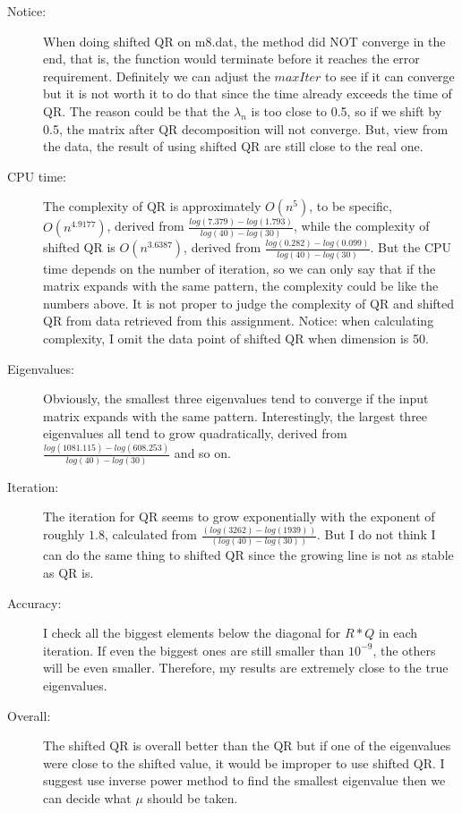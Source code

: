 \documentclass[12pt,a4paper]{article}
\begin{document}
\begin{description}
\item [Notice:] When doing shifted QR on m8.dat, the method did NOT converge in the end, that is, the function would terminate before it reaches the error requirement. Definitely we can adjust the $maxIter$ to see if it can converge but it is not worth it to do that since the time already exceeds the time of QR. The reason could be that the $\lambda_n$ is too close to 0.5, so if we shift by 0.5, the matrix after QR decomposition will not converge. But, view from the data, the result of using shifted QR are still close to the real one.
\item [CPU time:]  The complexity of QR is approximately $O(n^5)$, to be specific, $O(n^{4.9177})$, derived from $\frac{log(7.379) - log(1.793)}{log(40) - log(30)}$, while the complexity of shifted QR is $O(n^{3.6387})$, derived from $\frac{log(0.282) - log(0.099)}{log(40) - log(30)}$. But the CPU time depends on the number of iteration, so we can only say that if the matrix expands with the same pattern, the complexity could be like the numbers above. It is not proper to judge the complexity of QR and shifted QR from data retrieved from this assignment. Notice: when calculating complexity, I omit the data point of shifted QR when dimension is 50.
\item [Eigenvalues:] Obviously, the smallest three eigenvalues tend to converge if the input matrix expands with the same pattern. Interestingly, the largest three eigenvalues all tend to grow quadratically, derived from $\frac{log(1081.115) - log(608.253)}{log(40) - log(30)}$ and so on. 

\item [Iteration:] The iteration for QR seems to grow exponentially with the exponent of roughly $1.8$, calculated from $\frac{(log(3262) - log(1939))}{(log(40) - log(30))}$. But I do not think I can do the same thing to shifted QR since the growing line is not as stable as QR is.

\item [Accuracy:]  I check all the biggest elements below the diagonal for $R * Q$ in each iteration. If even the biggest ones are still smaller than $10^{-9}$, the others will be even smaller. Therefore, my results are extremely close to the true eigenvalues.\\

\item[Overall:] The shifted QR is overall better than the QR but if one of the eigenvalues were close to the shifted value, it would be improper to use shifted QR. I suggest use inverse power method to find the smallest eigenvalue then we can decide what $\mu$ should be taken.

\end{description}
\end{document}
